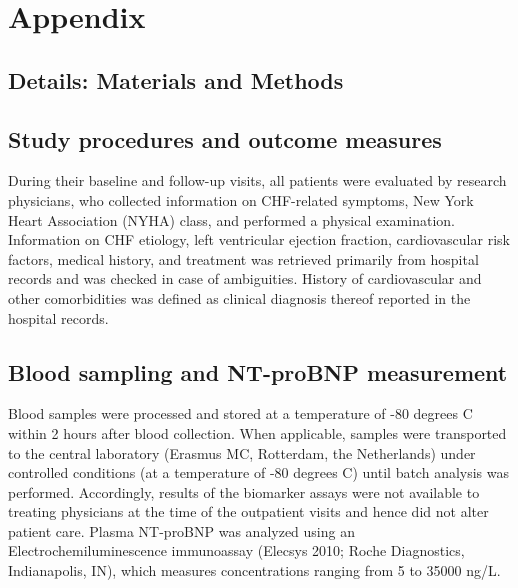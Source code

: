 \section*{Appendix}

\begin{subappendices}
\section{Details: Materials and Methods}
\subsection{Study procedures and outcome measures}
During their baseline and follow-up visits, all patients were evaluated by research physicians, who collected information on CHF-related symptoms, New York Heart Association (NYHA) class, and performed a physical examination. Information on CHF etiology, left ventricular ejection fraction, cardiovascular risk factors, medical history, and treatment was retrieved primarily from hospital records and was checked in case of ambiguities. History of cardiovascular and other comorbidities was defined as clinical diagnosis thereof reported in the hospital records.

\subsection{Blood sampling and NT-proBNP measurement}
Blood samples were processed and stored at a temperature of -80 degrees C within 2 hours after blood collection. When applicable, samples were transported to the central laboratory (Erasmus MC, Rotterdam, the Netherlands) under controlled conditions (at a temperature of -80 degrees C) until batch analysis was performed. Accordingly, results of the biomarker assays were not available to treating physicians at the time of the outpatient visits and hence did not alter patient care. Plasma NT-proBNP was analyzed using an Electrochemiluminescence immunoassay (Elecsys 2010; Roche Diagnostics, Indianapolis, IN), which measures concentrations ranging from 5 to 35000 ng/L. 


\end{subappendices}
